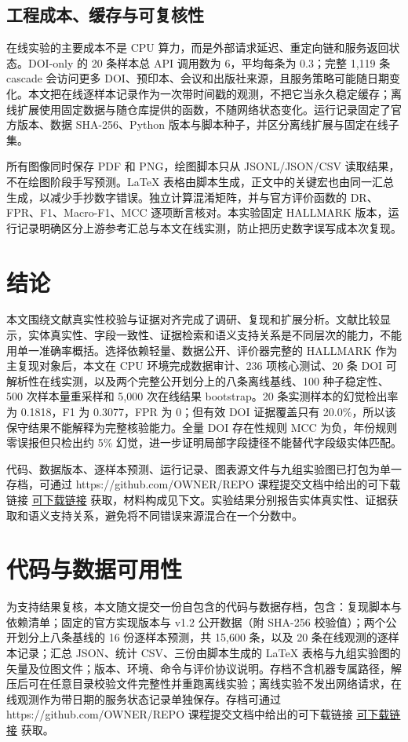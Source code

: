 \documentclass[UTF8,a4paper,11pt]{ctexart}
\newcommand{\CodeDataURL}{https://github.com/OWNER/REPO}
\newcommand{\CodeDataLink}{%
  \ifx\CodeDataURL\empty
    课程提交文档中给出的可下载链接%
  \else
    \href{\CodeDataURL}{可下载链接}%
  \fi}
\begin{document}
\subsection{工程成本、缓存与可复核性}

在线实验的主要成本不是 CPU 算力，而是外部请求延迟、重定向链和服务返回状态。DOI-only 的 20 条样本总 API 调用数为 6，平均每条为 0.3；完整 1,119 条 cascade 会访问更多 DOI、预印本、会议和出版社来源，且服务策略可能随日期变化。本文把在线逐样本记录作为一次带时间戳的观测，不把它当永久稳定缓存；离线扩展使用固定数据与随仓库提供的函数，不随网络状态变化。运行记录固定了官方版本、数据 SHA-256、Python 版本与脚本种子，并区分离线扩展与固定在线子集。

所有图像同时保存 PDF 和 PNG，绘图脚本只从 JSONL/JSON/CSV 读取结果，不在绘图阶段手写预测。LaTeX 表格由脚本生成，正文中的关键宏也由同一汇总生成，以减少手抄数字错误。独立计算混淆矩阵，并与官方评价函数的 DR、FPR、F1、Macro-F1、MCC 逐项断言核对。本实验固定 HALLMARK 版本，运行记录明确区分上游参考汇总与本文在线实测，防止把历史数字误写成本次复现。

\section{结论}

本文围绕文献真实性校验与证据对齐完成了调研、复现和扩展分析。文献比较显示，实体真实性、字段一致性、证据检索和语义支持关系是不同层次的能力，不能用单一准确率概括。选择依赖轻量、数据公开、评价器完整的 HALLMARK 作为主复现对象后，本文在 CPU 环境完成数据审计、236 项核心测试、20 条 DOI 可解析性在线实测，以及两个完整公开划分上的八条离线基线、100 种子稳定性、500 次样本量重采样和 5,000 次在线结果 bootstrap。20 条实测样本的幻觉检出率为 0.1818，F1 为 0.3077，FPR 为 0；但有效 DOI 证据覆盖只有 20.0\%，所以该保守结果不能解释为完整核验能力。全量 DOI 存在性规则 MCC 为负，年份规则零误报但只检出约 5\% 幻觉，进一步证明局部字段捷径不能替代字段级实体匹配。

代码、数据版本、逐样本预测、运行记录、图表源文件与九组实验图已打包为单一存档，可通过 \CodeDataLink{} 获取，材料构成见下文。实验结果分别报告实体真实性、证据获取和语义支持关系，避免将不同错误来源混合在一个分数中。

\section*{代码与数据可用性}

为支持结果复核，本文随文提交一份自包含的代码与数据存档，包含：复现脚本与依赖清单；固定的官方实现版本与 v1.2 公开数据（附 SHA-256 校验值）；两个公开划分上八条基线的 16 份逐样本预测，共 15,600 条，以及 20 条在线观测的逐样本记录；汇总 JSON、统计 CSV、三份由脚本生成的 LaTeX 表格与九组实验图的矢量及位图文件；版本、环境、命令与评价协议说明。存档不含机器专属路径，解压后可在任意目录校验文件完整性并重跑离线实验；离线实验不发出网络请求，在线观测作为带日期的服务状态记录单独保存。存档可通过 \CodeDataLink{} 获取。

\printbibliography[heading=bibintoc,title={参考文献}]
\end{document}
